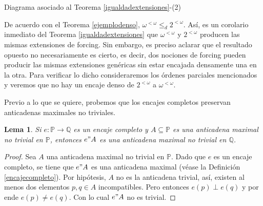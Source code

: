 \documentclass[11pt]{unam_tesis1}
\theoremstyle{MyThmStyle}
\theoremstyle{definition}
\theoremstyle{plain}
\newtheorem{lemma}[definition]{Lema}
\theoremstyle{remark}
\let\leq\leqslant
\begin{document}
\begin{center}



\centering

Diagrama asociado al Teorema \ref{igualdadextensiones}-(2)
\end{center}
\newpage
De acuerdo con el Teorema \ref{ejemplodenso}, $\omega^{<\omega}\leq_d 2^{<\omega}$. As\'i, es un corolario inmediato del Teorema \ref{igualdadextensiones} que $\omega^{<\omega}$ y $2^{<\omega}$ producen las mismas extensiones de forcing. Sin embargo, es preciso aclarar que el resultado opuesto no necesariamente es cierto, es decir, dos nociones de forcing pueden producir las mismas extensiones gen\'ericas sin estar encajada densamente una en la otra. Para verificar lo dicho consideraremos los \'ordenes parciales mencionados y veremos que no hay un encaje denso de $2^{<\omega}$ a $\omega^{<\omega}$.

Previo a lo que se quiere, probemos que los encajes completos preservan anticadenas maximales no triviales.

\begin{lemma}\label{atrivialenatrivial}
Si $e:\mathbb P\to \mathbb Q$ es un encaje completo y $A\subseteq \mathbb P$ es una anticadena maximal no trivial en $\mathbb P$, entonces $e"A$ es una anticadena maximal no trivial en $\mathbb Q$.
\end{lemma}

\begin{proof}
Sea $A$ una anticadena maximal no trivial en $\mathbb P$. Dado que $e$ es un encaje completo, se tiene que $e"A$ es una anticadena maximal (v\'ease la Definici\'on \ref{encajecompleto}). Por hip\'otesis, $A$ no es la anticadena trivial, as\'i, existen al menos dos elementos $p,q\in A$ incompatibles. Pero entonces $e(p)\perp e(q)$ y por ende $e(p)\neq e(q)$. Con lo cual $e"A$ no es trivial.
\end{proof}
\end{document}
